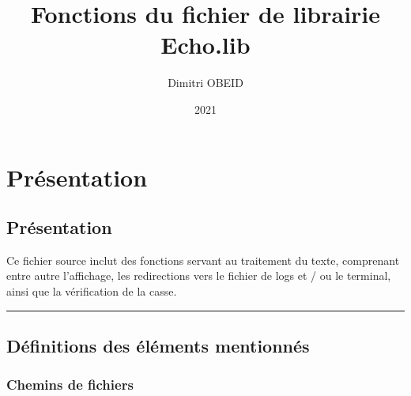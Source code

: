 \documentclass[a4paper,10pt]{article}
\title{\color{red}Fonctions du fichier de librairie \color{lime}Echo.lib}\color{white}
\author{Dimitri OBEID}
\date{2021}
\begin{document}
\maketitle
\newpage

\hypertarget{contents}{}
\tableofcontents
\newpage

\color{red}
\section{Présentation}\color{white}

\color{green}
\subsection{Présentation}\color{white}

\begin{justify}
    Ce fichier source inclut des fonctions servant au traitement du texte, comprenant entre autre l'affichage, les redirections vers le fichier de logs et / ou le terminal, ainsi que la vérification de la casse.
\end{justify}



\color{green}\par\noindent\rule{\textwidth}{0.4pt}\color{white}

\color{green}
\subsection{Définitions des éléments mentionnés}\color{white}

\color{blue}
\subsubsection{Chemins de fichiers}\color{white}
\end{document}
